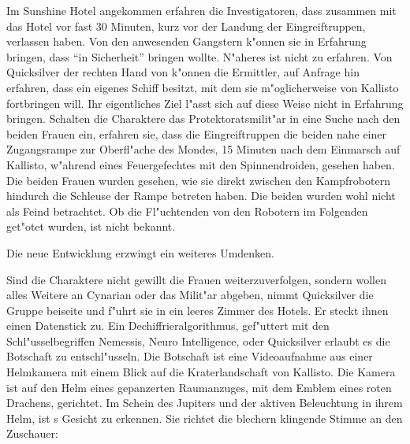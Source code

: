 Im Sunshine Hotel angekommen erfahren die Investigatoren, dass \xl{} zusammen mit \ml{} das Hotel vor fast 30 Minuten, kurz vor der Landung der Eingreiftruppen, verlassen haben. Von den anwesenden Gangstern k"onnen sie in Erfahrung bringen, dass \xl{} \ml{} "`in Sicherheit"' bringen wollte. N"aheres ist nicht zu erfahren. Von Quicksilver der rechten Hand von \xl{} k"onnen die Ermittler, auf Anfrage hin erfahren, dass \xl{} ein eigenes Schiff besitzt, mit dem sie m"oglicherweise \ml{} von Kallisto fortbringen will. Ihr eigentliches Ziel l"asst sich auf diese Weise nicht in Erfahrung bringen. Schalten die Charaktere das Protektoratsmilit"ar in eine Suche nach den beiden Frauen ein, erfahren sie, dass die Eingreiftruppen die beiden nahe einer Zugangsrampe zur Oberfl"ache des Mondes, 15 Minuten nach dem Einmarsch auf Kallisto, w"ahrend eines Feuergefechtes mit den Spinnendroiden, gesehen haben. Die beiden Frauen wurden gesehen, wie sie direkt zwischen den Kampfrobotern hindurch die Schleuse der Rampe betreten haben. Die beiden wurden wohl nicht als Feind betrachtet. Ob die Fl"uchtenden von den Robotern im Folgenden get"otet wurden, ist nicht bekannt.

Die neue Entwicklung erzwingt ein weiteres Umdenken. 

Sind die Charaktere nicht gewillt die Frauen weiterzuverfolgen, sondern wollen alles Weitere an Cynarian oder das Milit"ar abgeben, nimmt Quicksilver die Gruppe beiseite und f"uhrt sie in ein leeres Zimmer des Hotels. Er steckt ihnen einen Datenstick zu.  Ein Dechiffrieralgorithmus, gef"uttert mit den Schl"usselbegriffen Nemessis, Neuro Intelligence, \xl{} oder Quicksilver erlaubt es die Botschaft zu entschl"usseln. Die Botschaft ist eine Videoaufnahme aus einer Helmkamera mit einem Blick auf die Kraterlandschaft von Kallisto. Die Kamera ist auf den Helm eines gepanzerten Raumanzuges, mit dem Emblem eines roten Drachens, gerichtet. Im Schein des Jupiters und der aktiven Beleuchtung in ihrem Helm, ist \xl{}s Gesicht zu erkennen. Sie richtet die blechern klingende Stimme an den Zuschauer:


